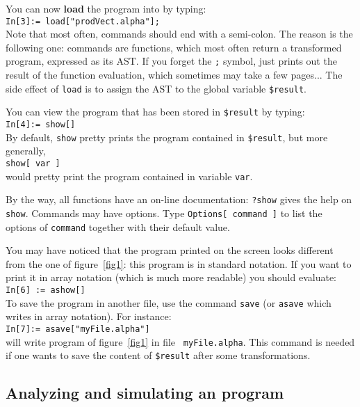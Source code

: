 You can now {\bf load} the {\Alpha} program into \mma{}
by typing:\\
{\tt In[3]:= load["prodVect.alpha"]; }\\
Note that most often, \mmalfa{} commands should end with a semi-colon.
The reason is the following one: \mmalfa{} commands are \mma{} functions, 
which most often return a transformed \alfa{} program, expressed
as its AST. 
If you forget the {\tt ;} symbol,
\mma{} just prints out the result of the function evaluation, 
which sometimes may take a few pages... 
The side effect of \texttt{load} is to assign the AST  to 
the global \mma{} variable {\tt \$result}.

You can view the program that has been stored in {\tt \$result} by typing:\\
{\tt In[4]:= show[] } \\
By default, \texttt{show} pretty prints the program contained 
in {\tt \$result}, but more generally, \\\texttt{show[ var ]}\\would
pretty print the program contained in \mma{} variable \texttt{var}.

By the way, all \mma{} functions have an on-line documentation: 
\texttt{?show} gives the help on \texttt{show}. Commands
may have options. Type \texttt{Options[ command ]} to list
the options of \texttt{command} together with their default value.

You may have noticed that the program printed on the screen looks
different from the one of figure~\ref{fig1}: this program is in
standard notation. If you want to print it in array notation (which is
much more readable) you should evaluate: \\ {\tt In[6] := ashow[]}\\

To save the {\Alpha} program in another file, use
the command {\tt save} (or {\tt asave} which writes in array
notation).  For instance: \\ {\tt In[7]:= asave["myFile.alpha"] }\\
will write program of figure~\ref{fig1} in file {\tt
myFile.alpha}.
This command is needed if one wants to save
the content of \texttt{\$result} after some transformations. 

\subsection{Analyzing and simulating an {\Alpha} program}

